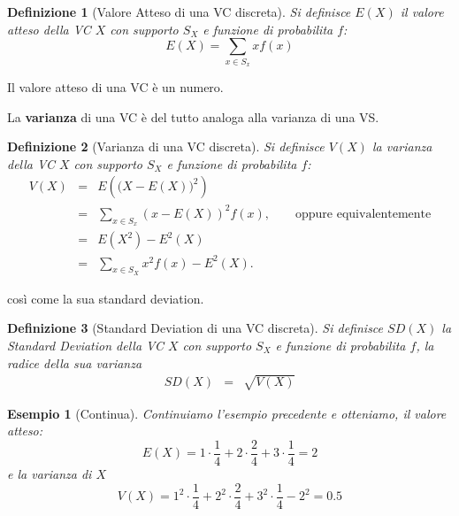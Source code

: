 \documentclass[
  11pt,
]{book}
\theoremstyle{mytheoremstyle}
\theoremstyle{mydefstyle}
\newtheorem{definition}{Definizione}[section]
\newtheorem{example}{{Esempio}}[section]
\newenvironment{att}
  {
\begin{tcolorbox}[enhanced,arc=0.1mm,boxrule=1pt,colback=white,colframe=ared,title=\bf\small \fontfamily{lmss}\selectfont \faExclamationTriangle \hspace{.5 cm} Attenzione,drop fuzzy shadow]
}{
\end{tcolorbox}
  }
\begin{document}
\begin{info}

\begin{definition}[Valore Atteso di una VC discreta]
Si definisce \(E(X)\) il valore atteso della VC \(X\) con supporto \(S_X\) e funzione di probabilita \(f\):
\[
E(X)=\sum_{x\in S_x}xf(x)
\]
\end{definition}

\end{info}

\begin{att}
Il valore atteso di una VC è un numero.

\end{att}

La \textbf{varianza} di una VC è del tutto analoga alla varianza di una VS.

\begin{info}

\begin{definition}[Varianza di una VC discreta]
Si definisce \(V(X)\) la varianza della VC \(X\) con supporto \(S_X\) e funzione di probabilita \(f\):
\begin{eqnarray*} 
V(X)&=&E\left(\big(X-E(X)\big)^2\right)\\ 
    &=&\sum_{x\in S_x}(x-E(X))^2f(x),\qquad\text{oppure equivalentemente}\\
    &=& E(X^2)-E^2(X)\\
    &=&\sum_{x\in S_X}x^2f(x)-E^2(X). 
\end{eqnarray*}
\end{definition}

\end{info}

così come la sua standard deviation.

\begin{info}

\begin{definition}[Standard Deviation di una VC discreta]
Si definisce \(SD(X)\) la Standard Deviation della VC \(X\) con supporto \(S_X\) e funzione di probabilita \(f\),
la radice della sua varianza
\begin{eqnarray*} 
SD(X)&=&\sqrt{V(X)}
\end{eqnarray*}
\end{definition}

\end{info}

\begin{example}[Continua]
Continuiamo l'esempio precedente e otteniamo, il valore atteso:
\[
E(X)=1\cdot\frac 1 4 +2\cdot\frac 2 4+3\cdot\frac 1 4=2
\]
e la varianza di \(X\)
\[
V(X)=1^2\cdot\frac 1 4 +2^2\cdot\frac 2 4+3^2\cdot\frac 1 4 - 2^2= 0.5
\]
\end{example}
\end{document}
